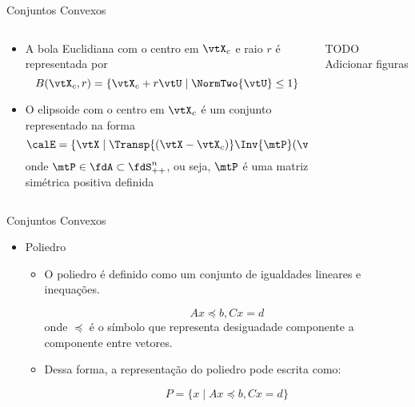 \begin{frame}{Conjuntos Convexos}
  \begin{columns}
    \begin{column}{0.48\linewidth}
      \begin{itemize}
        \item A bola Euclidiana com o centro em $\vtX_{c}$ e raio $r$ é representada por
        \begin{equation}\label{eq_ball}
          B(\vtX_{c}, r) = \{ \vtX_{c} + r\vtU \mid \NormTwo{\vtU} \leq 1 \}
        \end{equation}
        
        \item O elipsoide com o centro em $\vtX_{c}$ é um conjunto representado na forma
        \begin{equation}\label{eq_elipsoide}
          \calE = \{ \vtX \mid \Transp{(\vtX-\vtX_{c})} \Inv{\mtP} (\vtX-\vtX_{c}) \leq 1) \}
        \end{equation}
        onde $ \mtP \in \fdA \subset \fdS^n_{++}$, ou seja, $ \mtP $ é uma matriz simétrica positiva definida
      \end{itemize}
    \end{column}

    \hfill

    \begin{column}{0.48\linewidth}
      \begin{block}{TODO}
        Adicionar figuras
      \end{block}
    \end{column}
  \end{columns}
\end{frame}

\begin{frame}{Conjuntos Convexos}
  \begin{itemize}
    \item Poliedro
    \begin{itemize}
      \item O poliedro é definido como um conjunto de igualdades lineares e inequações.
      
      \begin{equation}\label{eq_poliedro}
      A x \preceq b, C x = d
      \end{equation}
      onde $\preceq$ é o símbolo que representa desiguadade componente a componente entre vetores.
      
      \item Dessa forma, a representação do poliedro pode escrita como: 
      
      \begin{equation}\label{eq_poliedro_2}
      P = \{ x \mid A x \preceq b, C x = d \}
      \end{equation}
    \end{itemize}
    
  \end{itemize}
\end{frame}


